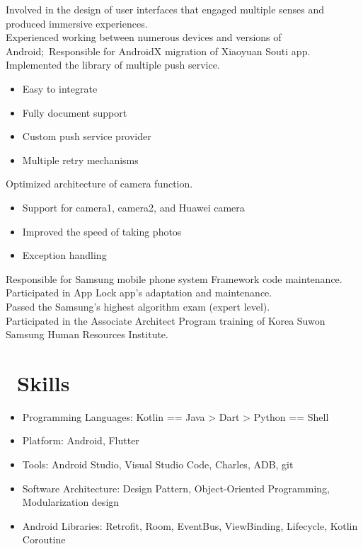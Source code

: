 \documentclass{resume}
\begin{document}
Involved in the design of user interfaces that engaged multiple senses and produced immersive experiences.\\
Experienced working between numerous devices and versions of Android;\ Responsible for AndroidX migration of Xiaoyuan Souti app.\\
Implemented the library of multiple push service.
\begin{itemize}
  \item Easy to integrate
  \item Fully document support
  \item Custom push service provider
  \item Multiple retry mechanisms
\end{itemize}
Optimized architecture of camera function.
\begin{itemize}
  \item Support for camera1, camera2, and Huawei camera
  \item Improved the speed of taking photos
  \item Exception handling
\end{itemize}

Responsible for Samsung mobile phone system Framework code maintenance.\\
Participated in App Lock app's adaptation and maintenance.\\
Passed the Samsung's highest algorithm exam (expert level).\\
Participated in the Associate Architect Program training of Korea Suwon Samsung Human Resources Institute.\\


\section{\faCogs\ Skills}
\begin{itemize}[parsep=0.5ex]
  \item Programming Languages: Kotlin == Java > Dart > Python == Shell
  \item Platform: Android, Flutter
  \item Tools: Android Studio, Visual Studio Code, Charles, ADB, git
  \item Software Architecture: Design Pattern, Object-Oriented Programming, Modularization design
  \item Android Libraries: Retrofit, Room, EventBus, ViewBinding, Lifecycle, Kotlin Coroutine
\end{itemize}
\end{document}
